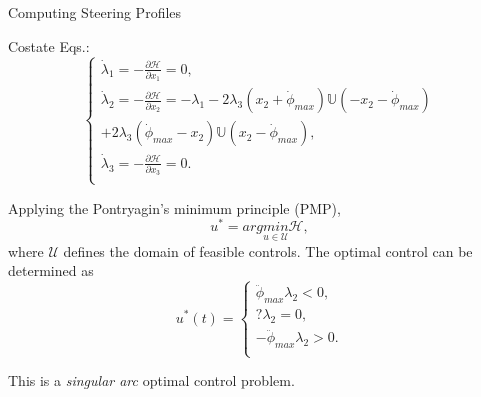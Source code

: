 \documentclass{beamer}
\newcounter{saveenumi}
\newcommand{\seti}{\setcounter{saveenumi}{\value{enumi}}}
\newcommand{\conti}{\setcounter{enumi}{\value{saveenumi}}}
\begin{document}
%
\begin{frame}{Computing Steering Profiles}

\begin{block}{ }
	\begin{enumerate}
	\conti
	\small{
	\item Costate Eqs.:
	\begin{equation}
	\left\{\begin{array}{l}
	               \dot{\lambda}_1=-\frac{\partial{\mathscr{H}}}{\partial{x_1}}=0,\\
	               \dot{\lambda}_2=-\frac{\partial{\mathscr{H}}}{\partial{x_2}}=-\lambda_1-2\lambda_3(x_2+\dot{\phi}_{max})\mathbb{U}(-x_2-\dot{\phi}_{max})\\
	+2\lambda_3(\dot{\phi}_{max}-x_2)\mathbb{U}(x_2-\dot{\phi}_{max}),\\
	              \dot{\lambda}_3=-\frac{\partial{\mathscr{H}}}{\partial{x_3}}=0.\\
	                \end{array}
	              \right.
	\end{equation}
	\item Applying the Pontryagin's minimum principle (PMP),
	\begin{equation}
	u^*=arg \underset{u\in\mathcal{U}}{min} \mathscr{H},
	\end{equation}
	where $\mathcal{U}$ defines the domain of feasible controls. The optimal control can be determined as
	\begin{equation}
	u^*(t)=\left\{
	           \begin{array}{I}
	           \ddot{\phi}_{max}    \lambda_2<0,\\
	           ?    \lambda_2=0,\\
	           -\ddot{\phi}_{max}    \lambda_2>0. \\
	                \end{array}
	              \right.
	\end{equation}
	 }
	\end{enumerate}
	\seti
	This is a {\it singular arc} optimal control problem.
	\end{block}
\end{frame}
\end{document}
